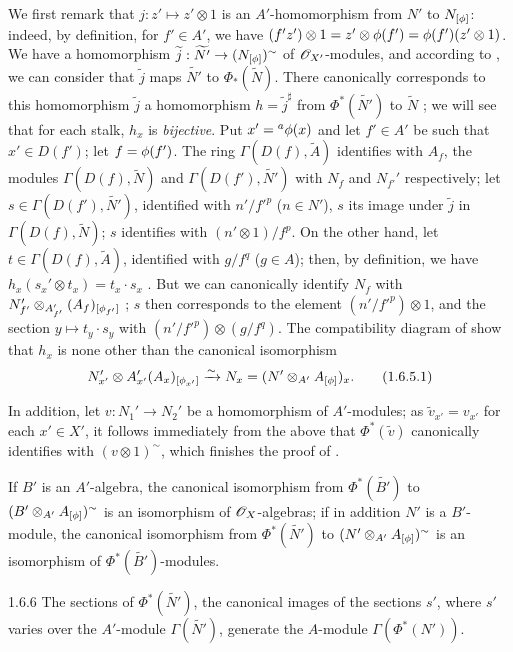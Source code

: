 We first remark that $j:z'\mapsto z'\otimes 1$ is an $A'$-homomorphism from $N'$ to
$N_{[\phi]}$: indeed, by definition, for $f'\in A'$, we have
$(f'z')\otimes 1=z'\otimes\phi(f')=\phi(f')(z'\otimes 1)$. We have  a
homomorphism $\widetilde{j}:\widetilde{N'}\to(N_{[\phi]})^\sim$ of $\mathscr{O}_{X'}$-modules, and
according to , we can consider that $\widetilde{j}$ maps $\widetilde{N'}$
to $\Phi_*(\widetilde{N})$. There canonically corresponds to this homomorphism
$\widetilde{j}$ a homomorphism $h=\widetilde{j}^\sharp$ from $\Phi^*(\widetilde{N'})$ to
$\widetilde{N}$ ; we will see that for each stalk, $h_x$ is \emph{bijective}.
Put $x'={}^a\phi(x)$ and let $f'\in A'$ be such that $x'\in D(f')$; let $f=\phi(f')$. The
ring $\Gamma(D(f),\widetilde{A})$ identifies with $A_f$, the modules
$\Gamma(D(f),\widetilde{N})$ and $\Gamma(D(f'),\widetilde{N'})$ with $N_f$ and $N_{f'}'$
respectively; let $s\in\Gamma(D(f'),\widetilde{N'})$, identified with $n'/{f'}^p$
($n\in N'$), $s$ its image under $\widetilde{j}$ in $\Gamma(D(f),\widetilde{N})$; $s$
identifies with $(n'\otimes 1)/f^p$. On the other hand, let $t\in\Gamma(D(f),\widetilde{A})$,
identified with $g/f^q$ ($g\in A$); then, by definition, we have
$h_x(s_x'\otimes t_x)=t_x\cdot s_x$ . But we can canonically identify $N_f$
with $N_{f'}'\otimes_{A_{f'}'}(A_f)_{[\phi_{f'}]}$ ; $s$ then corresponds
to the element $(n'/{f'}^p)\otimes 1$, and the section $y\mapsto t_y\cdot s_y$ with
$(n'/{f'}^p)\otimes(g/f^q)$. The compatibility diagram of  show that $h_x$
is none other than the canonical isomorphism
\[
  N_{x'}'\otimes{A_{x'}'}(A_x)_{[\phi_{x'}]}\xrightarrow{\sim} N_x=(N'\otimes_{A'}A_{[\phi]})_x.
  \tag{1.6.5.1}
\]

In addition, let $v:N_1'\to N_2'$ be a homomorphism of $A'$-modules; as
$\widetilde{v}_{x'}=v_{x'}$ for each $x'\in X'$, it follows immediately from the above that
$\Phi^*(\widetilde{v})$ canonically identifies with $(v\otimes 1)^\sim$, which finishes the
proof of .

If $B'$ is an $A'$-algebra, the canonical isomorphism from $\Phi^*(\widetilde{B'})$ to
$(B'\otimes_{A'}A_{[\phi]})^\sim$ is an isomorphism of $\mathscr{O}_X$-algebras; if in addition $N'$
is a $B'$-module, the canonical isomorphism from $\Phi^*(\widetilde{N'})$ to
$(N'\otimes_{A'}A_{[\phi]})^\sim$ is an isomorphism of $\Phi^*(\widetilde{B'})$-modules.

\begin{envs}[Corollary]{1.6.6}
\label{cor-1.1.6.6}
The sections of $\Phi^*(\widetilde{N'})$, the canonical images of the sections $s'$, where
$s'$ varies over the $A'$-module $\Gamma(\widetilde{N'})$, generate the $A$-module
$\Gamma(\Phi^*(N'))$.
\end{envs}

